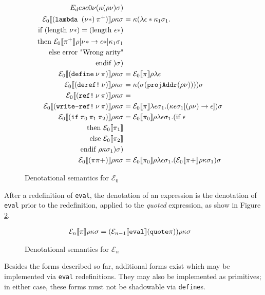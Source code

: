 \begin{figure}[H]
\begin{align*}
    E_desc{0}{\variable}{(\cont (\env \variable) \mem)} \\
    \denotationdesc{0}{(\lam (\variable *)\: \pi^{+})}{
      \cont (\lambda \val * \cont_1 \mem_1 . \\
        \text{if } (\text{length } \variable *) = (\text{length } \val *) \\
        \text{then } \denotation{0}{\pi^{+}}\env[\variable * \rightarrow} \val * ] \cont_1 \mem_1 \\
        \text{else } \text{error "Wrong arity"} \\
        \text{endif } ) \mem ) \\
    \denotationdesc{0}{(\define \: \variable \: \pi )}{
      \denotation{0}{\pi}\env \lambda \val
    } \\
    \denotationdesc{0}{(\deref \: \variable  )}{\cont (\mem (\texttt{projAddr}(\env \variable)))) \mem} \\
  \denotationdesc{0}{(\mkref \: \variable \: \pi)}{} \\
  \denotationdesc{0}{(\writeref \: \variable \: \pi)}{
      \denotation{0}{\pi} \lambda \val \mem_1 . (\cont \val \mem_1 [(\env
      \variable) \rightarrow \val]) \mem } \\
  \denotationdesc{0}{(\ifm \: \pi_0 \: \pi_1 \: \pi_2)}{\denotation{0}{\pi_0}\env
    \lambda \val \mem_1 .(\text{if } \val  \\
    \text{then } \denotation{0}{\pi_1}  \\
    \text{else } \denotation{0}{\pi_2} \\
    \text{endif } \env \cont \mem_1)  \mem ) } \\
  \denotationdesc{0}{(\pi \pi+ )}{
      \denotation{0}{\pi_0}\env \lambda \val \mem_1 . (\denotation{0}{\pi+}
      \env \cont \mem_1) \mem
  }
\end{align*}
\caption{Denotational semantics for $\mathcal{E}_{0}$}
\label{f:denotationalsem0}
\end{figure}

After a redefinition of \texttt{eval}, the denotation of an expression is the
denotation of \texttt{eval} prior to the redefinition, applied to the
\emph{quoted} expression, as show in Figure \ref{f:denotationalsemn}.

\begin{figure}[H]
\begin{align*}
  \mathcal{E}_{n} \llbracket \pi \rrbracket \rho \kappa \sigma &= (\mathcal{E}_{n-1} \llbracket \text{\texttt{eval}} \rrbracket  (\text{\texttt{quote}} \pi))\rho\kappa\sigma 
\end{align*}
\caption{Denotational semantics for $\mathcal{E}_{n}$}
\label{f:denotationalsemn}
\end{figure}

Besides the forms described so far, additional forms exist which may be
implemented via \texttt{eval} redefinitions. They may also be implemented as
primitives; in either case, these forms must not be shadowable via
\texttt{define}s.
